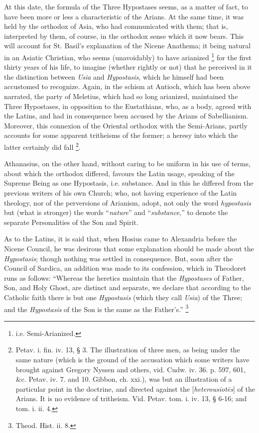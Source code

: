 At this date, the formula of the Three Hypostases seems, as a
matter of fact, to have been more or less a characteristic of the
Arians. At the same time, it was held by the orthodox of Asia, who had
communicated with them; that is, interpreted by them, of course, in
the orthodox sense which it now bears. This will account for St. Basil's
explanation of the Nicene Anathema; it being natural in an Asiatic
Christian, who seems (unavoidably) to have arianized \footnote{i.e. Semi-Arianized.} for the first thirty years of his life, to imagine (whether
rightly or not) that he perceived in it the distinction between \emph{Usia}
and \emph{Hypostasis}, which he himself had been accustomed to
recognize. Again, in the schism at Antioch, which has been above
narrated, the party of Meletius, which had so long arianized,
maintained the Three Hypostases, in opposition to the Eustathians,
who, as a body, agreed with the Latins, and had in consequence been
accused by the Arians of Sabellianism. Moreover, this connexion of the
Oriental orthodox with the Semi-Arians, partly accounts for some
apparent tritheisms of the former; a heresy into which the latter
certainly did fall \footnote{Petav. i. fin. iv. 13, § 3. The
illustration of three men, as being under the same nature (which is
the ground of the accusation which some writers have brought against
Gregory Nyssen and others, vid. Cudw. iv. 36. p. 597, 601, \&c.
Petav. iv. 7. and 10. Gibbon, ch. xxi.), was but an illustration of a
particular point in the doctrine, and directed against the [\emph{heterousiot\={e}s}]
of the Arians. It is no evidence of tritheism. Vid. Petav. tom. i. iv.
13, § 6-16; and tom. i. ii. 4.}.

Athanasius, on the other hand, without caring to be uniform in his
use of terms, about which the orthodox differed, favours the Latin
usage, speaking of the Supreme Being as one Hypostasis, i.e.
substance. And in this he differed from the previous writers of his
own Church; who, not having experience of the Latin theology, nor of
the perversions of Arianism, adopt, not only the word \emph{hypostasis}
but (what is stronger) the words ``\emph{nature}'' and ``\emph{substance},''
to denote the separate Personalities of the Son and Spirit.

As to the Latins, it is said that, when Hosius came to Alexandria
before the Nicene Council, he was desirous that some explanation
should be made about the \emph{Hypostasis}; though nothing was settled
in consequence. But, soon after the Council of Sardica, an addition
was made to its confession, which in Theodoret runs as follows:
``Whereas the heretics maintain that the \emph{Hypostases} of
Father, Son, and Holy Ghost, are distinct and separate, we declare
that according to the Catholic faith there is but one \emph{Hypostasis}
(which they call \emph{Usia}) of the Three; and the \emph{Hypostasis}
of the Son is the same as the Father's.'' \footnote{Theod. Hist. ii. 8.}

